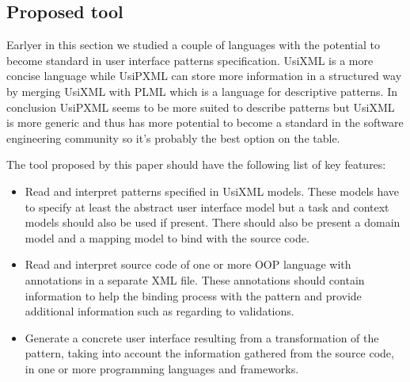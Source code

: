\subsection{Proposed tool}
Earlyer in this section we studied a couple of languages with the potential to become standard in user interface patterns specification. UsiXML is a more concise language while UsiPXML can store more information in a structured way by merging UsiXML with PLML which is a language for descriptive patterns. In conclusion UsiPXML seems to be more suited to describe patterns but UsiXML is more generic and thus has more potential to become a standard in the software engineering community so it's probably the best option on the table.

The tool proposed by this paper should have the following list of key features:
\begin{itemize}
\item Read and interpret patterns specified in UsiXML models. These models have to specify at least the abstract user interface model but a task and context models should also be used if present. There should also be present a domain model and a mapping model to bind with the source code.
\item Read and interpret source code of one or more OOP language with annotations in a separate XML file. These annotations should contain information to help the binding process with the pattern and provide additional information such as regarding to validations.
\item Generate a concrete user interface resulting from a transformation of the pattern, taking into account the information gathered from the source code, in one or more programming languages and frameworks.
\end{itemize}